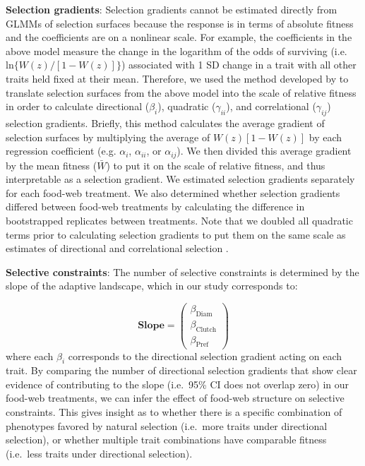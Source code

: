 \documentclass[11pt,]{article}
\begin{document}
\textbf{Selection gradients}: Selection gradients cannot be estimated
directly from GLMMs of selection surfaces because the response is in
terms of absolute fitness and the coefficients are on a nonlinear scale.
For example, the coefficients in the above model measure the change in
the logarithm of the odds of surviving (i.e.
\(\text{ln}\{W(z)/[1-W(z)]\}\)) associated with 1 SD change in a trait
with all other traits held fixed at their mean. Therefore, we used the
method developed by \citet{Janzen1998} to translate selection surfaces
from the above model into the scale of relative fitness in order to
calculate directional (\(\beta_i\)), quadratic (\(\gamma_{ii}\)), and
correlational (\(\gamma_{ij}\)) selection gradients. Briefly, this
method calculates the average gradient of selection surfaces by
multiplying the average of \(W(z)[1-W(z)]\) by each regression
coefficient (e.g. \(\alpha_i\), \(\alpha_{ii}\), or \(\alpha_{ij}\)). We
then divided this average gradient by the mean fitness (\(\bar W\)) to
put it on the scale of relative fitness, and thus interpretable as a
selection gradient. We estimated selection gradients separately for each
food-web treatment. We also determined whether selection gradients
differed between food-web treatments by calculating the difference in
bootstrapped replicates between treatments. Note that we doubled all
quadratic terms prior to calculating selection gradients to put them on
the same scale as estimates of directional and correlational selection
\citep{Stinchcombe2008}.

\textbf{Selective constraints}: The number of selective constraints is
determined by the slope of the adaptive landscape, which in our study
corresponds to:

\[\textbf{Slope} = \begin{pmatrix} \beta_{\text{Diam}} \\ \beta_{\text{Clutch}} \\ \beta_{\text{Pref}} \end{pmatrix} \]
where each \(\beta_i\) corresponds to the directional selection gradient
acting on each trait. By comparing the number of directional selection
gradients that show clear evidence of contributing to the slope
(i.e.~95\% CI does not overlap zero) in our food-web treatments, we can
infer the effect of food-web structure on selective constraints. This
gives insight as to whether there is a specific combination of
phenotypes favored by natural selection (i.e.~more traits under
directional selection), or whether multiple trait combinations have
comparable fitness (i.e.~less traits under directional selection).
\end{document}
